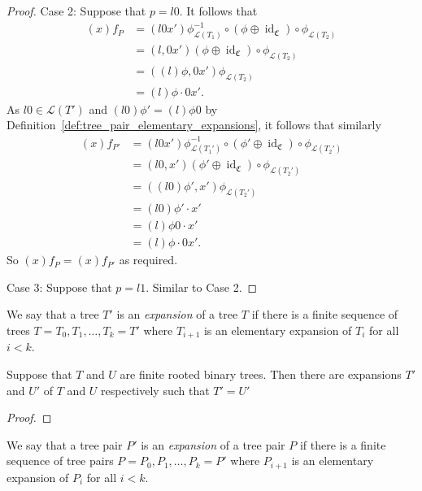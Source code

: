 \begin{proof}
Case 2: Suppose that \(p=l0\).
It follows that
\begin{align*}
    (x)f_P&=(l0x')\phi_{\mathcal{L}(T_1)}^{-1} \circ (\phi \oplus \operatorname{id}_{\mathfrak{C}})\circ \phi_{\mathcal{L}(T_2)}\\
    &= (l,0x')(\phi \oplus \operatorname{id}_{\mathfrak{C}})\circ \phi_{\mathcal{L}(T_2)}\\
    &= ((l)\phi,0x') \phi_{\mathcal{L}(T_2)}\\
    &= (l)\phi \cdot 0x' .
\end{align*}
As \(l0\in \mathcal{L}(T')\)  and \((l0)\phi'=(l)\phi 0\) by Definition~\ref{def:tree_pair_elementary_expansions}, it follows that similarly
\begin{align*}
    (x)f_{P'}&=(l0x')\phi_{\mathcal{L}(T_1')}^{-1} \circ (\phi' \oplus \operatorname{id}_{\mathfrak{C}})\circ \phi_{\mathcal{L}(T_2')}\\
    &= (l0,x')(\phi' \oplus \operatorname{id}_{\mathfrak{C}})\circ \phi_{\mathcal{L}(T_2')}\\
    &= ((l0)\phi',x') \phi_{\mathcal{L}(T_2')}\\
    &= (l0)\phi' \cdot x'\\
    &= (l)\phi  0\cdot x'\\
    &= (l)\phi\cdot  0 x'.
\end{align*}
So \((x)f_P=(x)f_{P'}\) as required.

Case 3: Suppose that \(p=l1\). Similar to Case 2.
\end{proof}

\begin{definition}\label{def:tree_expansions}
    We say that a tree \(T'\) is an \emph{expansion} of a tree \(T\) if there is a finite sequence of trees \(T=T_0, T_1,\ldots, T_k= T'\) where \(T_{i+1}\) is an elementary expansion of \(T_i\) for all \(i<k\).
\end{definition}

\begin{lemma}\label{lem:common_tree_expansions}
Suppose that \(T\) and \(U\) are finite rooted binary trees.
Then there are expansions \(T'\) and \(U'\) of \(T\) and \(U\) respectively such that \(T'=U'\)
\end{lemma}
\begin{proof}
\end{proof}

\begin{definition}\label{def:tree_pair_expansions}
    We say that a tree pair \(P'\) is an \emph{expansion} of a tree pair \(P\) if there is a finite sequence of tree pairs \(P=P_0, P_1,\ldots, P_k= P'\) where \(P_{i+1}\) is an elementary expansion of \(P_i\) for all \(i<k\).
\end{definition}



